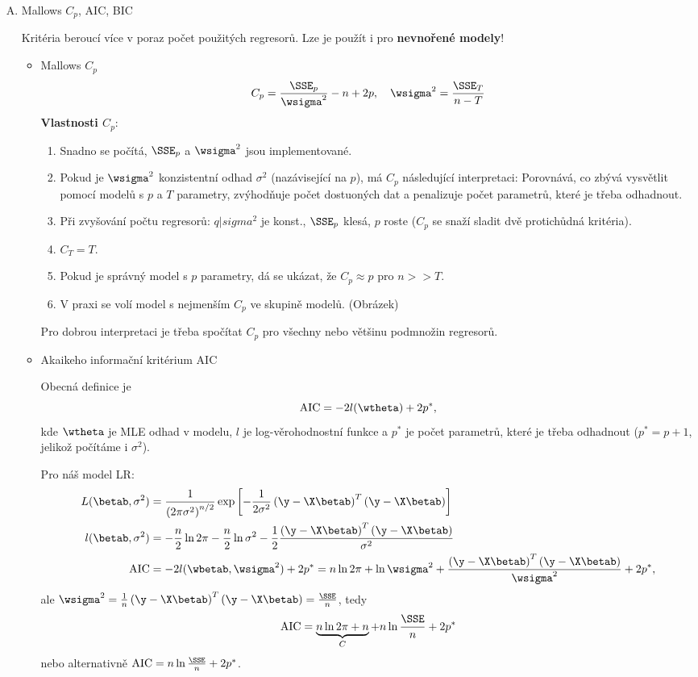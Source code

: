 \begin{enumerate}[A)]

\item
Mallows $C_p$, AIC, BIC

Kritéria beroucí více v poraz počet použitých regresorů. Lze je použít i pro \textbf{nevnořené modely}!
\begin{itemize}
\item Mallows $C_p$
$$
C_p = \frac{\SSE_p}{\wsigma^2} - n + 2p, \quad \wsigma^2 = \frac{\SSE_T}{n-T}
$$
\textbf{Vlastnosti $C_p$}:
\begin{enumerate}[1)]
\item Snadno se počítá, $\SSE_p$ a $\wsigma^2$ jsou implementované.
\item Pokud je $\wsigma^2$ konzistentní odhad $\sigma^2$ (nazávisející na $p$), má $C_p$ následující interpretaci: Porovnává, co zbývá vysvětlit pomocí modelů s $p$ a $T$ parametry, zvýhodňuje počet dostuoných dat a penalizuje počet parametrů, které je třeba odhadnout.
\item Při zvyšování počtu regresorů: $q|sigma^2$ je konst., $\SSE_p$ klesá, $p$ roste ($C_p$ se snaží sladit dvě protichůdná kritéria).
\item $C_T = T$.
\item Pokud je správný model s $p$ parametry, dá se ukázat, že $C_p \approx p$ pro $n >> T$.
\item V praxi se volí model s nejmenším $C_p$ ve skupině modelů. (Obrázek)
\end{enumerate}

\begin{remark}
Pro dobrou interpretaci je třeba spočítat $C_p$ pro všechny nebo většinu podmnožin regresorů.
\end{remark}

\item
Akaikeho informační kritérium AIC

\newcommand{\AIC}{\mathrm{AIC}}
Obecná definice je
$$
\AIC = -2l(\wtheta) + 2p^*,
$$
kde $\wtheta$ je MLE odhad v modelu, $l$ je log-věrohodnostní funkce a $p^*$ je počet parametrů, které je třeba odhadnout ($p^* = p + 1$, jelikož počítáme i $\sigma^2$).

Pro náš model LR:
\begin{align*}
L(\betab,\sigma^2) & = \frac{1}{\left(2\pi \sigma^2\right)^{n/2}} \exp \left[ - \frac{1}{2\sigma^2} \left( \y - \X \betab \right)^T \left( \y - \X \betab \right) \right] \\
l(\betab, \sigma^2) & = - \frac{n}{2} \ln 2\pi - \frac{n}{2} \ln \sigma^2 - \frac{1}{2} \frac{\left( \y - \X \betab \right)^T \left( \y - \X \betab \right)}{\sigma^2} \\
\AIC & = -2l(\wbetab, \wsigma^2) + 2p^* = n \ln 2\pi + \ln \wsigma^2 + \frac{\left( \y - \X \betab \right)^T \left( \y - \X \betab \right)}{\wsigma^2} + 2p^*,
\end{align*}
ale $\wsigma^2 = \frac{1}{n} \left( \y - \X \betab \right)^T \left( \y - \X \betab \right) = \frac{\SSE}{n}$, tedy
$$
\AIC = \underbrace{n \ln 2 \pi + n}_{C} + n \ln \frac{\SSE}{n} + 2p^*
$$
nebo alternativně $\AIC = n \ln \frac{\SSE}{n} + 2p^*$.


\end{itemize}
\end{enumerate}
